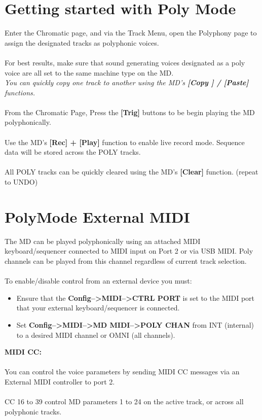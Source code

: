 \section{Getting started with Poly Mode}
Enter the Chromatic page, and via the Track Menu, open the Polyphony page to assign the designated tracks as polyphonic voices.\\\\
For best results, make sure that sound generating voices designated as a poly voice are all set to the same machine type on the MD.\\\textit{You can quickly copy one track to another using the MD's \textbf{[Copy ] / [Paste]} functions.}
\\\\From the Chromatic Page, Press the \textbf{[Trig]} buttons to be begin playing the MD polyphonically.\\\\
Use the MD’s \textbf{[Rec] + [Play]} function to enable live record mode.  Sequence data will be stored across the POLY tracks.\\\\
All POLY tracks can be quickly cleared using the MD’s \textbf{[Clear]} function. (repeat to UNDO)
\section{PolyMode External MIDI}
The MD can be played polyphonically using an attached MIDI keyboard/sequencer connected to MIDI input on Port 2 or via USB MIDI.  Poly channels can be played from this channel regardless of current track selection.\\\\
To enable/disable control from an external device you must:  
\begin{itemize}
    \item Ensure that the \textbf{Config-->MIDI-->CTRL PORT} is set to the MIDI port that your external keyboard/sequencer is connected.
    \item Set \textbf{Config-->MIDI-->MD MIDI-->POLY CHAN} from INT (internal) to a desired MIDI channel or OMNI (all channels).
\end{itemize}
\textbf{MIDI CC:}\\\\
You can control the voice parameters by sending MIDI CC messages via an External MIDI controller to port 2.\\\\CC 16 to 39 control MD parameters 1 to 24 on the active track, or across all polyphonic tracks.

